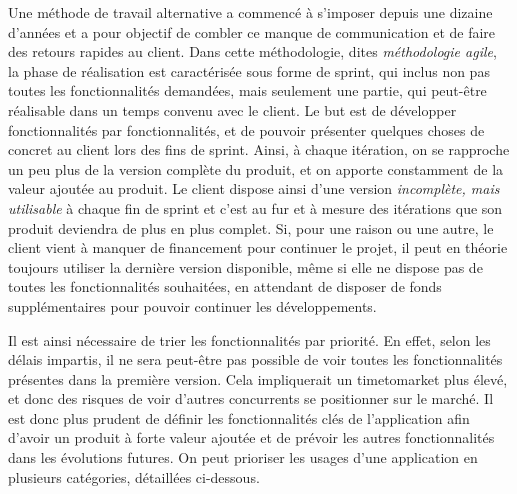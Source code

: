 Une méthode de travail alternative a commencé à s'imposer depuis une dizaine d'années et a pour objectif de combler ce manque de communication et de faire des retours rapides au client. Dans cette méthodologie, dites \emph{méthodologie agile}, la phase de réalisation est caractérisée sous forme de sprint, qui inclus non pas toutes les fonctionnalités demandées, mais seulement une partie, qui peut-être réalisable dans un temps convenu avec le client. Le but est de développer fonctionnalités par fonctionnalités, et de pouvoir présenter quelques choses de concret au client lors des fins de sprint. Ainsi, à chaque itération, on se rapproche un peu plus de la version complète du produit, et on apporte constamment de la valeur ajoutée au produit. Le client dispose ainsi d'une version \emph{incomplète, mais utilisable} à chaque fin de sprint et c'est au fur et à mesure des itérations que son produit deviendra de plus en plus complet. Si, pour une raison ou une autre, le client vient à manquer de financement pour continuer le projet, il peut en théorie toujours utiliser la dernière version disponible, même si elle ne dispose pas de toutes les fonctionnalités souhaitées, en attendant de disposer de fonds supplémentaires pour pouvoir continuer les développements.


Il est ainsi nécessaire de trier les fonctionnalités par priorité. En effet, selon les délais impartis, il ne sera peut-être pas possible de voir toutes les fonctionnalités présentes dans la première version. Cela impliquerait un \gls{timetomarket} plus élevé, et donc des risques de voir d'autres concurrents se positionner sur le marché. Il est donc plus prudent de définir les fonctionnalités clés de l'application afin d'avoir un produit à forte valeur ajoutée et de prévoir les autres fonctionnalités dans les évolutions futures. On peut prioriser les usages d'une application en plusieurs catégories, détaillées ci-dessous.

